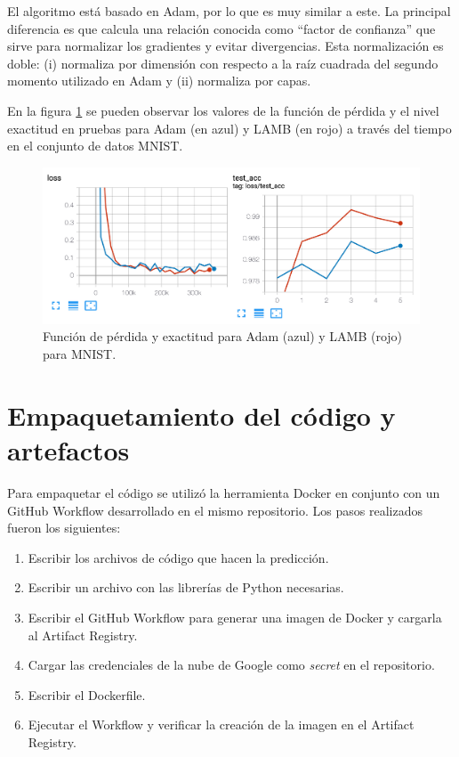 El algoritmo está basado en Adam, por lo que es muy similar a este. La principal diferencia es que calcula una relación conocida como ``factor de confianza'' que sirve para normalizar los gradientes y evitar divergencias. Esta normalización es doble: (i) normaliza por dimensión con respecto a la raíz cuadrada del segundo momento utilizado en Adam y (ii) normaliza por capas.

En la figura \ref{fig:cap3-lamb} se pueden observar los valores de la función de pérdida y el nivel exactitud en pruebas para Adam (en azul) y LAMB (en rojo) a través del tiempo en el conjunto de datos MNIST.

\begin{figure}[htbp]
	\centering
	\includegraphics[width=.8\textwidth]{./Figures/cap3-adam-vs-lamb.png}
	\caption{Función de pérdida y exactitud para Adam (azul) y LAMB (rojo) para MNIST\protect\footnotemark.}
	\label{fig:cap3-lamb}
\end{figure}


\section{Empaquetamiento del código y artefactos}

Para empaquetar el código se utilizó la herramienta Docker en conjunto con un GitHub Workflow desarrollado en el mismo repositorio. Los pasos realizados fueron los siguientes:
\begin{enumerate}
	\item Escribir los archivos de código que hacen la predicción.
	\item Escribir un archivo con las librerías de Python necesarias.
	\item Escribir el GitHub Workflow para generar una imagen de Docker y cargarla al Artifact Registry.
	\item Cargar las credenciales de la nube de Google como \textit{secret} en el repositorio.
	\item Escribir el Dockerfile.
	\item Ejecutar el Workflow y verificar la creación de la imagen en el Artifact Registry.
\end{enumerate}

